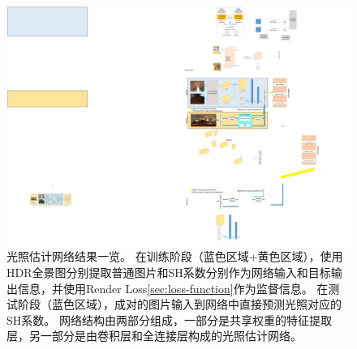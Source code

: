 \begin{figure}
    \includegraphics[width=1.0\textwidth]{Img/fig-overview.pdf}
    \caption[光照估计网络结果一览]{
        \label{fig:overview}
        光照估计网络结果一览。
        在训练阶段（蓝色区域+黄色区域），使用HDR全景图分别提取普通图片和SH系数分别作为网络输入和目标输出信息，并使用Render Loss\ref{sec:loss-function}作为监督信息。
        在测试阶段（蓝色区域），成对的图片输入到网络中直接预测光照对应的SH系数。
        网络结构由两部分组成，一部分是共享权重的特征提取层，另一部分是由卷积层和全连接层构成的光照估计网络。
   }
\end{figure}